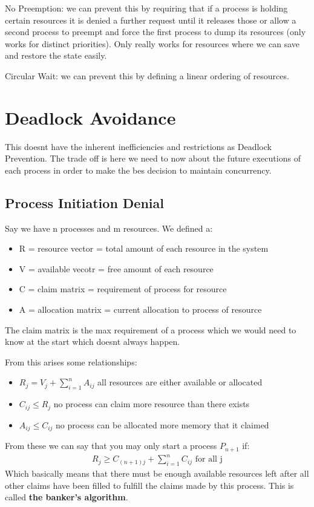 \documentclass[12pt]{article}
\begin{document}
No Preemption: we can prevent this by requiring that if a process is holding certain resources it is denied a further request until it releases those or allow a second process to preempt and force the first process to dump its resources (only works for distinct priorities). Only really works for resources where we can save and restore the state easily.

Circular Wait: we can prevent this by defining a linear ordering of resources.

\section{Deadlock Avoidance}
This doesnt have the inherent inefficiencies and restrictions as Deadlock Prevention. The trade off is here we need to now about the future executions of each process in order to make the bes decision to maintain concurrency.

\subsection{Process Initiation Denial}
Say we have n processes and m resources. We defined a:
\begin{itemize}
  \item R = resource vector = total amount of each resource in the system
  \item V = available vecotr = free amount of each resource
  \item C = claim matrix = requirement of process for resource
  \item A = allocation matrix = current allocation to process of resource
\end{itemize}

The claim matrix is the max requirement of a process which we would need to know at the start which doesnt always happen.

From this arises some relationships:
\begin{itemize}
  \item $R_j = V_j + \sum_{i=1}^n A_{ij}$ all resources are either available or allocated
  \item $C_{ij} \leq R_j$ no process can claim more resource than there exists
  \item $A_{ij} \leq C_{ij}$ no process can be allocated more memory that it claimed
\end{itemize}

From these we can say that you may only start a process $P_{n+1}$ if:
\begin{align*}
  R_j \geq C_{(n+1)j} + \sum_{i=1}^n C_{ij} \text{ for all j}
\end{align*}
Which basically means that there must be enough available resources left after all other claims have been filled to fulfill the claims made by this process. This is called \textbf{the banker's algorithm}.
\end{document}
